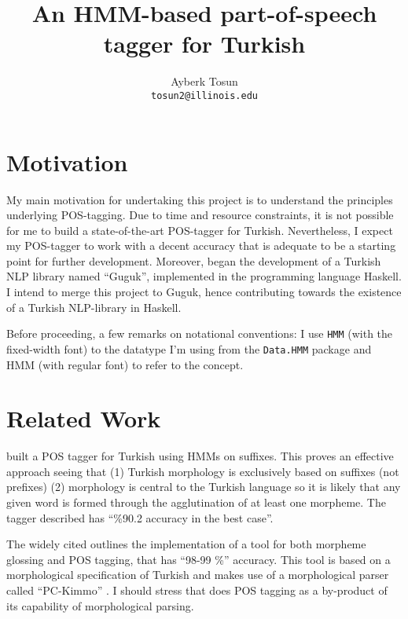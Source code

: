 \documentclass{article}
\title{\bf An HMM-based part-of-speech tagger for Turkish}
\author{Ayberk Tosun\\\texttt{tosun2@illinois.edu}}
\date{}
\begin{document}
\maketitle

\section{Motivation}
\label{sec:motivation}
My main motivation for undertaking this project is to understand the
principles underlying POS-tagging. Due to time and resource constraints, it is
not possible for me to build a state-of-the-art POS-tagger for
Turkish. Nevertheless, I expect my POS-tagger
to work with a decent accuracy that is adequate to be a starting point for
further development. Moreover, \citet{Korkut2015} began the development of a
Turkish NLP library named ``Guguk'', implemented in the programming language Haskell. I intend
to merge this project to Guguk, hence contributing towards
the existence of a Turkish NLP-library in Haskell.

Before proceeding, a few remarks on notational conventions: I use
\texttt{HMM} (with the fixed-width font) to the datatype I'm using from the
\texttt{Data.HMM} package and HMM (with regular font) to refer to the concept.

\section{Related Work}
\label{sec:related_work}

\cite{dincer2008suffix} built a POS tagger for Turkish using HMMs on suffixes.
This proves an effective approach seeing that (1) Turkish morphology is
exclusively based on suffixes (not prefixes) (2) morphology is central to the
Turkish language so it is likely that any given word is formed through the
agglutination of at least one morpheme. The tagger described has ``\%90.2
accuracy in the best case''.

The widely cited \citet{oflazer1994tagging} outlines the implementation of a
tool for both morpheme glossing and POS tagging, that has ``98-99 \%'' accuracy.
This tool is based on a morphological specification of Turkish and makes use of
a morphological parser called ``PC-Kimmo'' \citep{antworth1991pc}. I should
stress that \citet{oflazer1994tagging} does POS tagging as a by-product of its
capability of morphological parsing.
\end{document}
